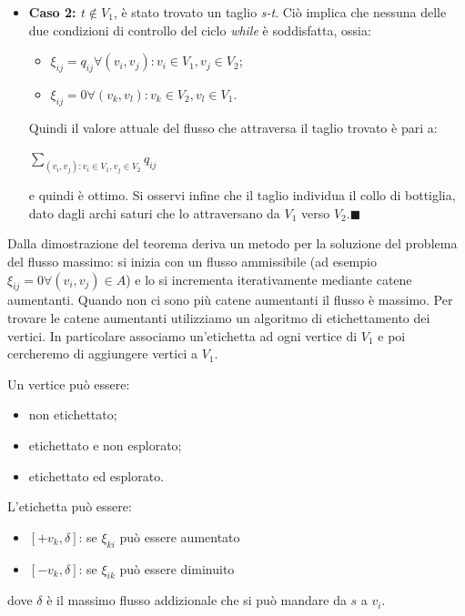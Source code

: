 \documentclass[11pt]{book}
\begin{document}
\begin{itemize}
  Si ottiene quindi un nuovo flusso ammissibile $\xi$ con valore
  aumentato di $\delta$ unit\`a al quale si pu\`o riapplicare la
  seconda procedura, e cos\`i via, iterando fino a quando si termina
  nella seconda situazione.

\item {\bf Caso 2: $t \not\in V_1$}, \`e stato trovato un taglio {\em
  s-t}. Ci\`o implica che nessuna delle due condizioni di controllo
  del ciclo {\em while} \`e soddisfatta, ossia:

  \begin{itemize}
  \item $\xi_{ij} = q_{ij} \forall (v_i,v_j) : v_i \in V_1, v_j \in
    V_2$;
  \item $\xi_{ij} = 0 \forall (v_k,v_l) : v_k \in V_2, v_l \in V_1$.
  \end{itemize}

  Quindi il valore attuale del flusso che attraversa il taglio trovato
  \`e pari a:

  \begin{center}
 $\sum\limits_{(v_i,v_j) : v_i \in V_1, v_j \in V_2} q_{ij}$
  \end{center}
  
 e quindi \`e ottimo. Si osservi infine che il taglio individua il
 collo di bottiglia, dato dagli archi saturi che lo attraversano da
 $V_1$ verso $V_2$.$\blacksquare$

\end{itemize}
\vspace{11pt}


Dalla dimostrazione del teorema deriva un metodo per la soluzione del
problema del flusso massimo: si inizia con un flusso ammissibile (ad
esempio $\xi_{ij} = 0 \forall (v_i,v_j) \in A$) e lo si incrementa
iterativamente mediante catene aumentanti. Quando non ci sono pi\`u
catene aumentanti il flusso \`e massimo. Per trovare le catene
aumentanti utilizziamo un algoritmo di etichettamento dei vertici. In
particolare associamo un'etichetta ad ogni vertice di $V_1$ e poi
cercheremo di aggiungere vertici a $V_1$.


Un vertice pu\`o essere:
\begin{itemize}
\item non etichettato;
\item etichettato e non esplorato;
\item etichettato ed esplorato.
\end{itemize}


L'etichetta pu\`o essere:
\begin{itemize}
\item $[+v_k, \delta]$: se $\xi_{ki}$ pu\`o essere aumentato
\item $[-v_k, \delta]$: se $\xi_{ik}$ pu\`o essere diminuito
\end{itemize}
dove $\delta$ \`e il massimo flusso addizionale che si pu\`o mandare da $s$ a $v_i$.
\end{document}
